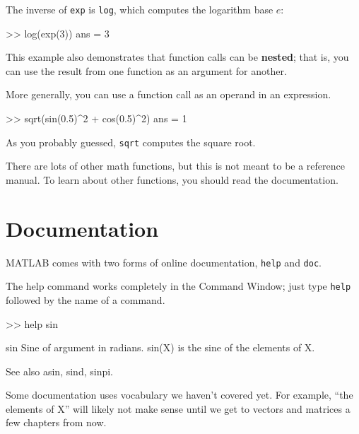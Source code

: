 \documentclass[main.tex]{subfiles}
\begin{document}

The inverse of {\tt exp} is {\tt log}, which computes the logarithm base $e$:

\begin{code}
>> log(exp(3))
ans = 3
\end{code}

This example also demonstrates that function calls can be {\bf nested};
that is, you can use the result from one function as an argument for
another.


More generally, you can use a function call as an operand in an expression.

\begin{code}
>> sqrt(sin(0.5)^2 + cos(0.5)^2)
ans = 1
\end{code}

As you probably guessed, {\tt sqrt} computes the square root.


There are lots of other math functions, but this is not meant to
be a reference manual.  To learn about other functions, you should
read the documentation.


\section{Documentation}

MATLAB comes with two forms of online documentation, {\tt help}
and {\tt doc}.


The help command works completely in the Command Window; just 
type {\tt help} followed by the name of a command.


\begin{code}
>> help sin
\end{code}
\begin{stdout}
 sin    Sine of argument in radians.
    sin(X) is the sine of the elements of X.
 
    See also asin, sind, sinpi.
\end{stdout}

Some documentation uses vocabulary we haven't covered yet.  
For example, ``the elements of X'' will likely not make sense until
we get to vectors and matrices a few chapters from now.
\end{document}
